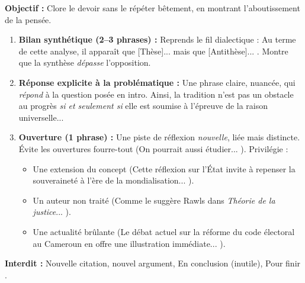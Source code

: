 \documentclass[11pt]{article}
\newcommand{\cle}[1]{{\popxbold\color{popdark}#1}}
\begin{document}
\begin{methode}
    \textbf{Objectif :} Clore le devoir sans le répéter bêtement, en montrant l'aboutissement de la pensée.
    \begin{enumerate}
        \item \textbf{Bilan synthétique (2--3 phrases) :} Reprends le fil dialectique : \guillemotleft Au terme de cette analyse, il apparaît que [Thèse]... mais que [Antithèse]... \guillemotright. Montre que la synthèse \emph{dépasse} l'opposition.
        \item \textbf{Réponse explicite à la problématique :} Une phrase claire, nuancée, qui \emph{répond} à la question posée en intro. \guillemotleft Ainsi, la tradition n'est pas un obstacle au progrès \emph{si et seulement si} elle est soumise à l'épreuve de la raison universelle... \guillemotright
        \item \textbf{Ouverture (1 phrase) :} Une piste de réflexion \emph{nouvelle}, liée mais distincte. Évite les ouvertures \guillemotleft fourre-tout \guillemotright (\guillemotleft On pourrait aussi étudier... \guillemotright). Privilégie : \begin{itemize}
            \item Une extension du concept (\guillemotleft Cette réflexion sur l'État invite à repenser la \cle{souveraineté} à l'ère de la mondialisation... \guillemotright).
            \item Un auteur non traité (\guillemotleft Comme le suggère Rawls dans \emph{Théorie de la justice}... \guillemotright).
            \item Une actualité brûlante (\guillemotleft Le débat actuel sur la \cle{réforme du code électoral} au Cameroun en offre une illustration immédiate... \guillemotright).
        \end{itemize}
    \end{enumerate}
    \textbf{Interdit :} Nouvelle citation, nouvel argument, \guillemotleft En conclusion \guillemotright (inutile), \guillemotleft Pour finir \guillemotright.
\end{methode}
\end{document}
